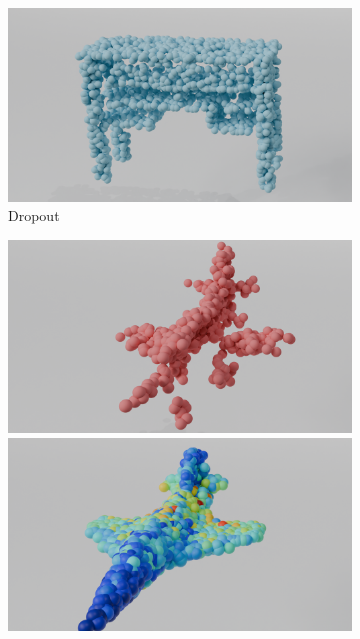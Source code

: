 \begin{figure}[htb]
\begin{subfigure}[t]{0.315\textwidth}
            \includegraphics[width=\textwidth]{figures/com_t1.png}
            \caption{Dropout}\label{fig:matchingwar2}
          \end{subfigure}\hfill
          \begin{subfigure}[t]{0.315\textwidth}
            \includegraphics[width=\textwidth]{figures/part_ap3.png}
            \includegraphics[width=\textwidth]{figures/ens_ind_ap3.png}

\end{subfigure}
\end{figure}

